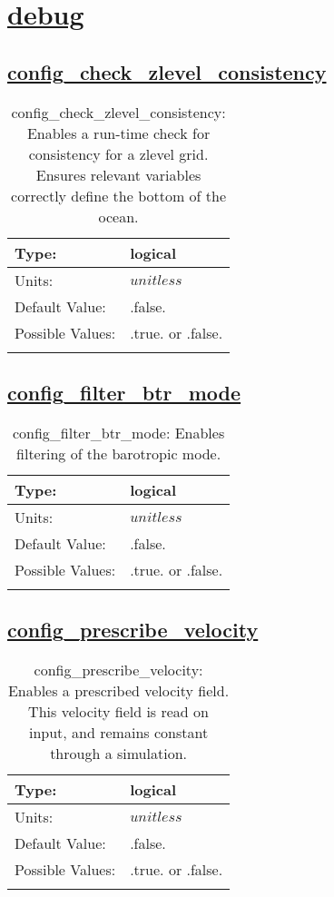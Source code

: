 \section[debug]{\hyperref[sec:nm_tab_debug]{debug}}
\label{sec:nm_sec_debug}
\subsection[config\_check\_zlevel\_consistency]{\hyperref[sec:nm_tab_debug]{config\_check\_zlevel\_consistency}}
\label{subsec:nm_sec_config_check_zlevel_consistency}
\begin{center}
\begin{longtable}{| p{2.0in} | p{4.0in} |}
    \hline
    Type: & logical \\
    \hline
    Units: & $unitless$ \\
    \hline
    Default Value: & .false. \\
    \hline
    Possible Values: & .true. or .false. \\
    \hline
    \caption{config\_check\_zlevel\_consistency: Enables a run-time check for consistency for a zlevel grid. Ensures relevant variables correctly define the bottom of the ocean.}
\end{longtable}
\end{center}
\subsection[config\_filter\_btr\_mode]{\hyperref[sec:nm_tab_debug]{config\_filter\_btr\_mode}}
\label{subsec:nm_sec_config_filter_btr_mode}
\begin{center}
\begin{longtable}{| p{2.0in} | p{4.0in} |}
    \hline
    Type: & logical \\
    \hline
    Units: & $unitless$ \\
    \hline
    Default Value: & .false. \\
    \hline
    Possible Values: & .true. or .false. \\
    \hline
    \caption{config\_filter\_btr\_mode: Enables filtering of the barotropic mode.}
\end{longtable}
\end{center}
\subsection[config\_prescribe\_velocity]{\hyperref[sec:nm_tab_debug]{config\_prescribe\_velocity}}
\label{subsec:nm_sec_config_prescribe_velocity}
\begin{center}
\begin{longtable}{| p{2.0in} | p{4.0in} |}
    \hline
    Type: & logical \\
    \hline
    Units: & $unitless$ \\
    \hline
    Default Value: & .false. \\
    \hline
    Possible Values: & .true. or .false. \\
    \hline
    \caption{config\_prescribe\_velocity: Enables a prescribed velocity field. This velocity field is read on input, and remains constant through a simulation.}
\end{longtable}
\end{center}

